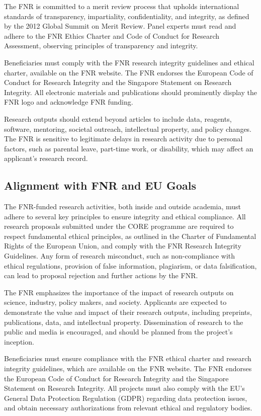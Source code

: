 \documentclass[12pt]{article}
\begin{document}
The FNR is committed to a merit review process that upholds international standards of transparency, impartiality, confidentiality, and integrity, as defined by the 2012 Global Summit on Merit Review. Panel experts must read and adhere to the FNR Ethics Charter and Code of Conduct for Research Assessment, observing principles of transparency and integrity.

Beneficiaries must comply with the FNR research integrity guidelines and ethical charter, available on the FNR website. The FNR endorses the European Code of Conduct for Research Integrity and the Singapore Statement on Research Integrity. All electronic materials and publications should prominently display the FNR logo and acknowledge FNR funding.

Research outputs should extend beyond articles to include data, reagents, software, mentoring, societal outreach, intellectual property, and policy changes. The FNR is sensitive to legitimate delays in research activity due to personal factors, such as parental leave, part-time work, or disability, which may affect an applicant's research record.

\subsection{Alignment with FNR and EU Goals}

The FNR-funded research activities, both inside and outside academia, must adhere to several key principles to ensure integrity and ethical compliance. All research proposals submitted under the CORE programme are required to respect fundamental ethical principles, as outlined in the Charter of Fundamental Rights of the European Union, and comply with the FNR Research Integrity Guidelines. Any form of research misconduct, such as non-compliance with ethical regulations, provision of false information, plagiarism, or data falsification, can lead to proposal rejection and further actions by the FNR.

The FNR emphasizes the importance of the impact of research outputs on science, industry, policy makers, and society. Applicants are expected to demonstrate the value and impact of their research outputs, including preprints, publications, data, and intellectual property. Dissemination of research to the public and media is encouraged, and should be planned from the project's inception.

Beneficiaries must ensure compliance with the FNR ethical charter and research integrity guidelines, which are available on the FNR website. The FNR endorses the European Code of Conduct for Research Integrity and the Singapore Statement on Research Integrity. All projects must also comply with the EU’s General Data Protection Regulation (GDPR) regarding data protection issues, and obtain necessary authorizations from relevant ethical and regulatory bodies.
\end{document}
